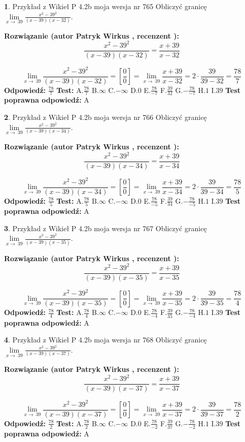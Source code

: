 \documentclass[12pt, a4paper]{article}
\theoremstyle{definition} %
\newtheorem{zad}{}
\newcommand{\zadStart}[1]{\begin{zad}#1\newline}
\newcommand{\zadStop}{\end{zad}}
\newcommand{\rozwStart}[2]{\noindent \textbf{Rozwiązanie (autor #1 , recenzent #2): }\newline}
\newcommand{\rozwStop}{\newline}
\newcommand{\odpStart}{\noindent \textbf{Odpowiedź:}\newline}
\newcommand{\odpStop}{\newline}
\newcommand{\testStart}{\noindent \textbf{Test:}\newline}
\newcommand{\testStop}{\newline}
\newcommand{\kluczStart}{\noindent \textbf{Test poprawna odpowiedź:}\newline}
\newcommand{\kluczStop}{\newline}
\begin{document}
\zadStart{Przykład z Wikieł P 4.2b moja wersja nr 765}
Obliczyć granicę $\lim\limits_{x\to\ 39}\frac{x^{2}-39^{2}}{(x-39)(x-32)}$.
\zadStop
\rozwStart{Patryk Wirkus}{}
$$\frac{x^{2}-39^{2}}{(x-39)(x-32)}=\frac{x+39}{x-32}$$

$$\lim\limits_{x\to\ 39}\frac{x^{2}-39^{2}}{(x-39)(x-32)}=[\frac{0}{0}]=\lim\limits_{x\to\ 39}\frac{x+39}{x-32}=2 \cdot \frac{39}{39-32} = \frac{78}{7}$$
\rozwStop
\odpStart
$\frac{78}{7}$
\odpStop
\testStart
A.$\frac{78}{7}$
B.$\infty$
C.$-\infty$
D.$0$
E.$\frac{78}{-7}$
F.$\frac{39}{32}$
G.$-\frac{78}{-7}$
H.$1$
I.$39$
\testStop
\kluczStart
A
\kluczStop



\zadStart{Przykład z Wikieł P 4.2b moja wersja nr 766}
Obliczyć granicę $\lim\limits_{x\to\ 39}\frac{x^{2}-39^{2}}{(x-39)(x-34)}$.
\zadStop
\rozwStart{Patryk Wirkus}{}
$$\frac{x^{2}-39^{2}}{(x-39)(x-34)}=\frac{x+39}{x-34}$$

$$\lim\limits_{x\to\ 39}\frac{x^{2}-39^{2}}{(x-39)(x-34)}=[\frac{0}{0}]=\lim\limits_{x\to\ 39}\frac{x+39}{x-34}=2 \cdot \frac{39}{39-34} = \frac{78}{5}$$
\rozwStop
\odpStart
$\frac{78}{5}$
\odpStop
\testStart
A.$\frac{78}{5}$
B.$\infty$
C.$-\infty$
D.$0$
E.$\frac{78}{-5}$
F.$\frac{39}{34}$
G.$-\frac{78}{-5}$
H.$1$
I.$39$
\testStop
\kluczStart
A
\kluczStop



\zadStart{Przykład z Wikieł P 4.2b moja wersja nr 767}
Obliczyć granicę $\lim\limits_{x\to\ 39}\frac{x^{2}-39^{2}}{(x-39)(x-35)}$.
\zadStop
\rozwStart{Patryk Wirkus}{}
$$\frac{x^{2}-39^{2}}{(x-39)(x-35)}=\frac{x+39}{x-35}$$

$$\lim\limits_{x\to\ 39}\frac{x^{2}-39^{2}}{(x-39)(x-35)}=[\frac{0}{0}]=\lim\limits_{x\to\ 39}\frac{x+39}{x-35}=2 \cdot \frac{39}{39-35} = \frac{78}{4}$$
\rozwStop
\odpStart
$\frac{78}{4}$
\odpStop
\testStart
A.$\frac{78}{4}$
B.$\infty$
C.$-\infty$
D.$0$
E.$\frac{78}{-4}$
F.$\frac{39}{35}$
G.$-\frac{78}{-4}$
H.$1$
I.$39$
\testStop
\kluczStart
A
\kluczStop



\zadStart{Przykład z Wikieł P 4.2b moja wersja nr 768}
Obliczyć granicę $\lim\limits_{x\to\ 39}\frac{x^{2}-39^{2}}{(x-39)(x-37)}$.
\zadStop
\rozwStart{Patryk Wirkus}{}
$$\frac{x^{2}-39^{2}}{(x-39)(x-37)}=\frac{x+39}{x-37}$$

$$\lim\limits_{x\to\ 39}\frac{x^{2}-39^{2}}{(x-39)(x-37)}=[\frac{0}{0}]=\lim\limits_{x\to\ 39}\frac{x+39}{x-37}=2 \cdot \frac{39}{39-37} = \frac{78}{2}$$
\rozwStop
\odpStart
$\frac{78}{2}$
\odpStop
\testStart
A.$\frac{78}{2}$
B.$\infty$
C.$-\infty$
D.$0$
E.$\frac{78}{-2}$
F.$\frac{39}{37}$
G.$-\frac{78}{-2}$
H.$1$
I.$39$
\testStop
\kluczStart
A
\kluczStop
\end{document}
